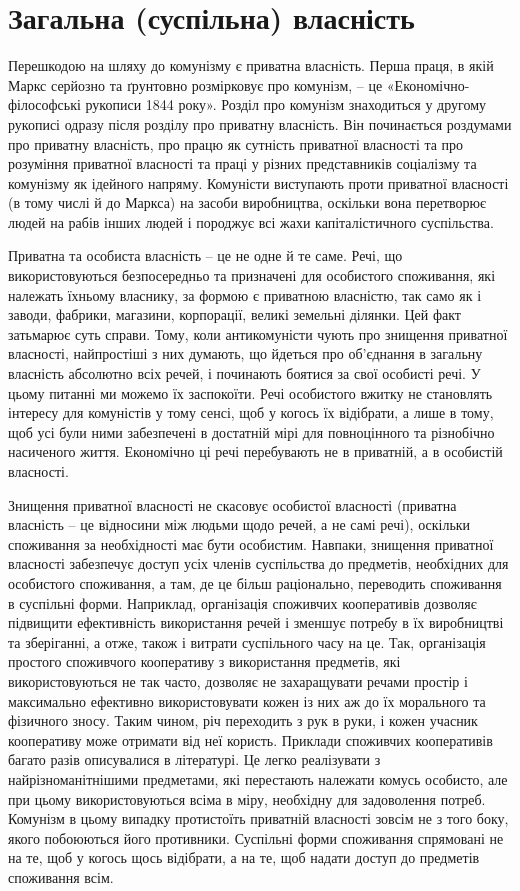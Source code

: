 \documentclass[../main]{subfiles}
\begin{document}
\ifSubfilesClassLoaded{\setcounter{page}{27}}{}
\section{Загальна (суспільна) власність}
\label{sec:05_obshhaya_sobstvennost}

Перешкодою на шляху до комунізму є приватна власність. Перша праця, в якій Маркс серйозно та ґрунтовно розмірковує про комунізм, – це «Економічно-філософські рукописи 1844 року». Розділ про комунізм знаходиться у другому рукописі одразу після розділу про приватну власність. Він починається роздумами про приватну власність, про працю як сутність приватної власності та про розуміння приватної власності та праці у різних представників соціалізму та комунізму як ідейного напряму. Комуністи виступають проти приватної власності (в тому числі й до Маркса) на засоби виробництва, оскільки вона перетворює людей на рабів інших людей і породжує всі жахи капіталістичного суспільства.

Приватна та особиста власність – це не одне й те саме. Речі, що використовуються безпосередньо та призначені для особистого споживання, які належать їхньому власнику, за формою є приватною власністю, так само як і заводи, фабрики, магазини, корпорації, великі земельні ділянки. Цей факт затьмарює суть справи. Тому, коли антикомуністи чують про знищення приватної власності, найпростіші з них думають, що йдеться про об’єднання в загальну власність абсолютно всіх речей, і починають боятися за свої особисті речі. У цьому питанні ми можемо їх заспокоїти. Речі особистого вжитку не становлять інтересу для комуністів у тому сенсі, щоб у когось їх відібрати, а лише в тому, щоб усі були ними забезпечені в достатній мірі для повноцінного та різнобічно насиченого життя. Економічно ці речі перебувають не в приватній, а в особистій власності.

Знищення приватної власності не скасовує особистої власності (приватна власність – це відносини між людьми щодо речей, а не самі речі), оскільки споживання за необхідності має бути особистим. Навпаки, знищення приватної власності забезпечує доступ усіх членів суспільства до предметів, необхідних для особистого споживання, а там, де це більш раціонально, переводить споживання в суспільні форми. Наприклад, організація споживчих кооперативів дозволяє підвищити ефективність використання речей і зменшує потребу в їх виробництві та зберіганні, а отже, також і витрати суспільного часу на це. Так, організація простого споживчого кооперативу з використання предметів, які використовуються не так часто, дозволяє не захаращувати речами простір і максимально ефективно використовувати кожен із них аж до їх морального та фізичного зносу. Таким чином, річ переходить з рук в руки, і кожен учасник кооперативу може отримати від неї користь. Приклади споживчих кооперативів багато разів описувалися в літературі. Це легко реалізувати з найрізноманітнішими предметами, які перестають належати комусь особисто, але при цьому використовуються всіма в міру, необхідну для задоволення потреб. Комунізм в цьому випадку протистоїть приватній власності зовсім не з того боку, якого побоюються його противники. Суспільні форми споживання спрямовані не на те, щоб у когось щось відібрати, а на те, щоб надати доступ до предметів споживання всім.
\end{document}
